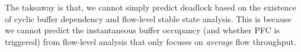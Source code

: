 The takeaway is that, we cannot simply predict deadlock based on the existence of cyclic buffer dependency
and flow-level stable state analysis. This is because we cannot predict
the instantaneous buffer occupancy (and whether PFC is triggered) from flow-level analysis that only
focuses on {\em average} flow throughput.

%
%

